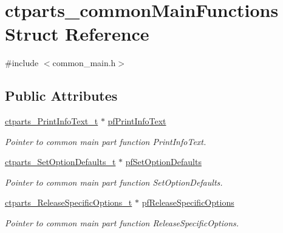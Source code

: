 \hypertarget{structctparts__commonMainFunctions}{}\section{ctparts\+\_\+common\+Main\+Functions Struct Reference}
\label{structctparts__commonMainFunctions}


{\ttfamily \#include $<$common\+\_\+main.\+h$>$}

\subsection*{Public Attributes}
\begin{DoxyCompactItemize}
\item 
\hypertarget{structctparts__commonMainFunctions_a1bb902c0551b21e730cd6058b8a55026}{}\label{structctparts__commonMainFunctions_a1bb902c0551b21e730cd6058b8a55026} 
\hyperlink{common__main_8h_a66b6bb95b562cfb93a85c632641eac61}{ctparts\+\_\+\+Print\+Info\+Text\+\_\+t} $\ast$ \hyperlink{structctparts__commonMainFunctions_a1bb902c0551b21e730cd6058b8a55026}{pf\+Print\+Info\+Text}
\begin{DoxyCompactList}\small\item\em Pointer to common main part function Print\+Info\+Text. \end{DoxyCompactList}\item 
\hypertarget{structctparts__commonMainFunctions_a018146b5e8fb6eb6ef282b79ccd5e015}{}\label{structctparts__commonMainFunctions_a018146b5e8fb6eb6ef282b79ccd5e015} 
\hyperlink{common__main_8h_a9a1acbf3b21726a84e4ace4d86690922}{ctparts\+\_\+\+Set\+Option\+Defaults\+\_\+t} $\ast$ \hyperlink{structctparts__commonMainFunctions_a018146b5e8fb6eb6ef282b79ccd5e015}{pf\+Set\+Option\+Defaults}
\begin{DoxyCompactList}\small\item\em Pointer to common main part function Set\+Option\+Defaults. \end{DoxyCompactList}\item 
\hypertarget{structctparts__commonMainFunctions_a4c149ca60b9fbd42f637baea98365e40}{}\label{structctparts__commonMainFunctions_a4c149ca60b9fbd42f637baea98365e40} 
\hyperlink{common__main_8h_a03dd0952f6764bfabe20ed7f0c3e51ba}{ctparts\+\_\+\+Release\+Specific\+Options\+\_\+t} $\ast$ \hyperlink{structctparts__commonMainFunctions_a4c149ca60b9fbd42f637baea98365e40}{pf\+Release\+Specific\+Options}
\begin{DoxyCompactList}\small\item\em Pointer to common main part function Release\+Specific\+Options. \end{DoxyCompactList}\item 

\end{DoxyCompactItemize}

